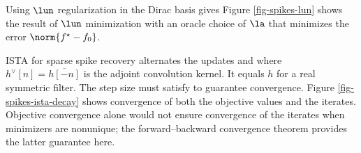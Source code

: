 
            
                                  
      
                       
                     

Using $\lun$ regularization in the Dirac basis gives
Figure \ref{fig-spikes-lun} shows the result of $\lun$ minimization with an oracle choice of $\la$ that minimizes the error $\norm{f^\star-f_0}$.



ISTA for sparse spike recovery alternates the updates
and
where $h^\vee[n]=\overline{h[-n]}$ is the adjoint convolution kernel. It equals $h$ for a real symmetric filter. The step size must satisfy
to guarantee convergence. Figure \ref{fig-spikes-ista-decay} shows convergence of both the objective values and the iterates. Objective convergence alone would not ensure convergence of the iterates when minimizers are nonunique; the forward--backward convergence theorem provides the latter guarantee here.




